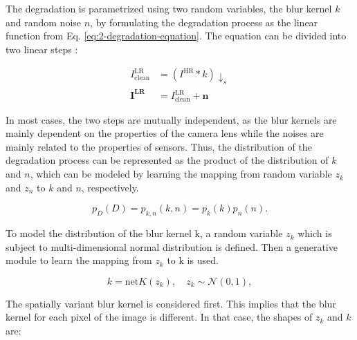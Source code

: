     
    The degradation is parametrized using two random variables, the blur kernel $k$ and random noise $n$, by formulating the degradation process as the linear function from Eq. \ref{eq:2-degradation-equation}.
    The equation can be divided into two linear steps \cite{zhu2020unpaired}: 

    \begin{equation}
        \begin{aligned}
                I^{\text{LR}}_{\text{clean}} &= (I^{\text{HR}} * k) \downarrow_s \\
                \mathbf{I^{\text{LR}}} &= I^{\text{LR}}_{\text{clean}} + \mathbf{n}
        \end{aligned}
    \end{equation}
    
    In most cases, the two steps are mutually independent, as the blur kernels are mainly dependent on the properties of the camera lens while the noises are mainly related to the properties of sensors. 
    Thus, the distribution of the degradation process can be represented as the product of the distribution of $k$ and $n$, which can be modeled by learning the mapping from random variable $z_k$ and $z_n$ to $k$ and $n$, respectively.


    \begin{equation}
        p_{D}(D) = p_{k,n}(k, n) = p_{k}(k)p_{n}(n).
    \end{equation}

    To model the distribution of the blur kernel k, a random variable $z_k$ which is subject to multi-dimensional normal distribution is defined. 
    Then a generative module to learn the mapping from $z_k$ to k is used. 

    \begin{equation}
        k = \text{net}K(z_k), \quad z_k \sim \mathcal{N}(0,1),
    \end{equation}

    The spatially variant blur kernel is considered first. This implies that the blur kernel for each pixel of the image is different. In that case, the shapes of $z_k$ and $k$ are:

